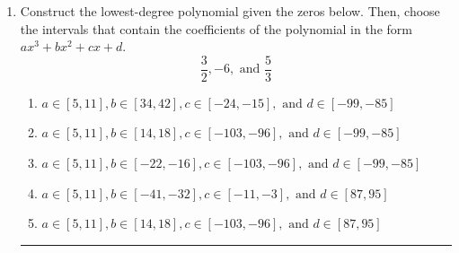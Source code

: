 \documentclass[14pt]{extbook}
\newcommand{\litem}[1]{\item#1\hspace*{-1cm}\rule{\textwidth}{0.4pt}}
\begin{document}
\begin{enumerate}
\litem{
Construct the lowest-degree polynomial given the zeros below. Then, choose the intervals that contain the coefficients of the polynomial in the form $ax^3+bx^2+cx+d$.\[ \frac{3}{2}, -6, \text{ and } \frac{5}{3} \]\begin{enumerate}[label=\Alph*.]
\item \( a \in [5, 11], b \in [34, 42], c \in [-24, -15], \text{ and } d \in [-99, -85] \)
\item \( a \in [5, 11], b \in [14, 18], c \in [-103, -96], \text{ and } d \in [-99, -85] \)
\item \( a \in [5, 11], b \in [-22, -16], c \in [-103, -96], \text{ and } d \in [-99, -85] \)
\item \( a \in [5, 11], b \in [-41, -32], c \in [-11, -3], \text{ and } d \in [87, 95] \)
\item \( a \in [5, 11], b \in [14, 18], c \in [-103, -96], \text{ and } d \in [87, 95] \)


\end{enumerate}}
\end{enumerate}
\end{document}

